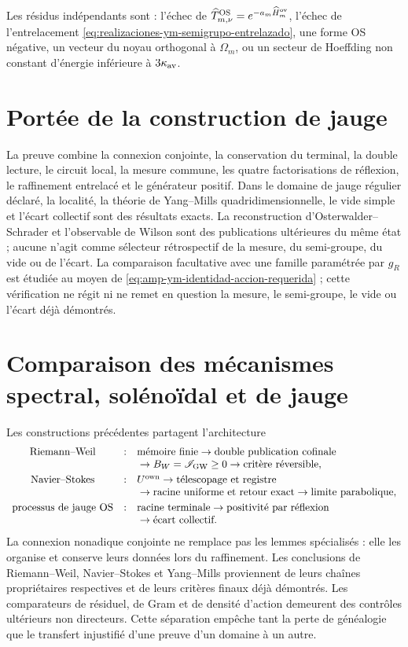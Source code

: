 Les résidus indépendants sont : l'échec de \(\widehat T_{m,\nu}^{\rm OS}=e^{-a_m\widehat H_m^{\rm ov}}\), l'échec de l'entrelacement \eqref{eq:realizaciones-ym-semigrupo-entrelazado}, une forme OS négative, un vecteur du noyau orthogonal à \(\Omega_m\), ou un secteur de Hoeffding non constant d'énergie inférieure à \(3\kappa_{\rm av}\).

\section*{Portée de la construction de jauge}

La preuve combine la connexion conjointe, la conservation du terminal, la
double lecture, le circuit local, la mesure commune, les quatre factorisations
de réflexion, le raffinement entrelacé et le générateur positif. Dans le
domaine de jauge régulier déclaré, la
localité, la théorie de Yang--Mills quadridimensionnelle, le vide simple et
l’écart collectif sont des résultats exacts. La reconstruction
d’Osterwalder--Schrader et l’observable de Wilson sont des
publications ultérieures du même état ; aucune n’agit comme
sélecteur rétrospectif de la mesure, du semi-groupe, du vide ou de
l’écart. La comparaison facultative avec une famille paramétrée par \(g_R\) est étudiée
au moyen de \eqref{eq:amp-ym-identidad-accion-requerida} ; cette vérification ne
régit ni ne remet en question la mesure, le semi-groupe, le vide ou l’écart déjà
démontrés.

\section*{Comparaison des mécanismes spectral, solénoïdal et de jauge}

Les constructions précédentes partagent l'architecture
\begin{equation}\label{eq:realizaciones-sintesis-tres}
 \begin{array}{ccl}
 \text{Riemann--Weil}
&:& \text{mémoire finie}\to\text{double publication cofinale}\\
&&{}\to B_W=\mathscr I_{\rm GW}\geq0
      \to\text{critère réversible},\\[1mm]
 \text{Navier--Stokes}
&:& U^{\rm own}\to\text{télescopage et registre}\\
&&{}\to\text{racine uniforme et retour exact}
      \to\text{limite parabolique},\\[1mm]
 \text{processus de jauge OS}
&:& \text{racine terminale}\to\text{positivité par réflexion}\\
&&{}
      \to\text{écart collectif}.
 \end{array}
\end{equation}
La connexion nonadique conjointe ne remplace pas les lemmes spécialisés : elle les
organise et conserve leurs données lors du raffinement. Les conclusions de
Riemann--Weil, Navier--Stokes et Yang--Mills proviennent de leurs chaînes
propriétaires respectives et de leurs critères finaux déjà démontrés. Les comparateurs
de résiduel, de Gram et de densité d'action demeurent des contrôles
ultérieurs non directeurs. Cette séparation empêche tant la perte de
généalogie que le transfert injustifié d'une preuve d'un domaine
à un autre.


